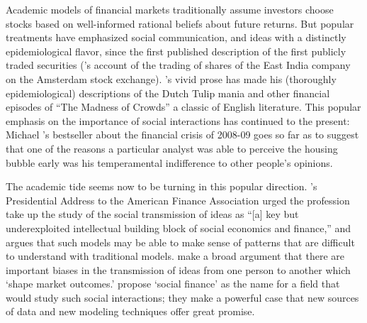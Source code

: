 Academic models of financial markets traditionally assume investors choose stocks based on well-informed rational beliefs about future returns.  But popular treatments have emphasized social communication, and ideas with a distinctly epidemiological flavor, since the first published description of  the first publicly traded securities (\cite{vegaConfusion}'s account of the trading of shares of the East India company on the Amsterdam stock exchange).  \cite{mackay1850memoirs}'s vivid prose has made his (thoroughly epidemiological) descriptions of the Dutch Tulip mania and other financial episodes of ``The Madness of Crowds'' a classic of English literature.  This popular emphasis on the importance of social interactions has continued to the present: Michael \cite{lewis2011big}'s bestseller about the financial crisis of 2008-09 goes so far as to suggest that one of the reasons a particular analyst was able to perceive the housing bubble early was his temperamental indifference to other people's opinions.


The academic tide seems now to be turning in this popular direction. \cite{hirshleifer2020presidential}'s Presidential Address to the American Finance Association urged the profession take up the study of the social transmission of ideas as ``[a] key but underexploited intellectual building block of social economics and finance,'' and argues that such models may be able to make sense of patterns that are difficult to understand with traditional models.  \cite{akccay2021social} make a broad argument that there are important biases in the transmission of ideas from one person to another which `shape market outcomes.' \cite{kuchler2021social} propose `social finance' as the name for a field that would study such social interactions; they make a powerful case that new sources of data and new modeling techniques offer great promise.

